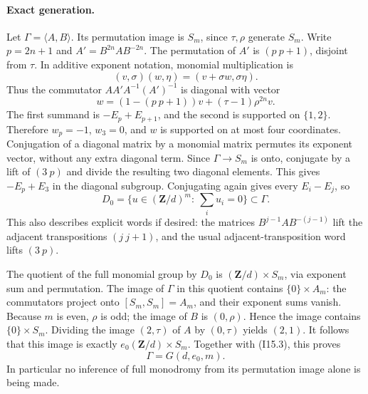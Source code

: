 \paragraph{Exact generation.}
Let $\Gamma=\langle A,B\rangle$.  Its permutation image is $S_m$,
since $\tau,\rho$ generate $S_m$.  Write $p=2n+1$ and
$A'=B^{2n}AB^{-2n}$.  The permutation of $A'$ is
$(p\ p+1)$, disjoint from $\tau$.  In additive exponent notation,
monomial multiplication is
\[
       (v,\sigma)(w,\eta)=(v+\sigma w,\sigma\eta).
\]
Thus the commutator $AA'A^{-1}(A')^{-1}$ is diagonal with vector
\begin{equation}
 w=(1-(p\ p+1))v+(\tau-1)\rho^{2n}v.
                                                       \tag{I15.2}
\end{equation}
The first summand is $-E_p+E_{p+1}$, and the second is supported on
$\{1,2\}$.  Therefore $w_p=-1$, $w_3=0$, and $w$ is supported on
at most four coordinates.  Conjugation of a diagonal matrix by a
monomial matrix permutes its exponent vector, without any extra
diagonal term.  Since $\Gamma\to S_m$ is onto, conjugate by a lift
of $(3\ p)$ and divide the resulting two diagonal elements.
This gives $-E_p+E_3$ in the diagonal subgroup.  Conjugating again
gives every $E_i-E_j$, so
\[
 D_0=\{u\in(\mathbf Z/d)^m:\ \sum_i u_i=0\}
                         \subset\Gamma.               \tag{I15.3}
\]
This also describes explicit words if desired: the matrices
$B^{j-1}AB^{-(j-1)}$ lift the adjacent transpositions $(j\ j+1)$,
and the usual adjacent-transposition word lifts $(3\ p)$.

The quotient of the full monomial group by $D_0$ is
$(\mathbf Z/d)\times S_m$, via exponent sum and permutation.
The image of $\Gamma$ in this quotient contains $\{0\}\times A_m$:
the commutators project onto $[S_m,S_m]=A_m$, and their exponent
sums vanish.  Because $m$ is even, $\rho$ is odd; the image of $B$
is $(0,\rho)$.  Hence the image contains $\{0\}\times S_m$.
Dividing the image $(2,\tau)$ of $A$ by $(0,\tau)$ yields $(2,1)$.
It follows that this image is exactly
$e_0(\mathbf Z/d)\times S_m$.  Together with (I15.3), this proves
\begin{equation}
                         \Gamma=G(d,e_0,m).             \tag{I15.4}
\end{equation}
In particular no inference of full monodromy from its permutation
image alone is being made.

